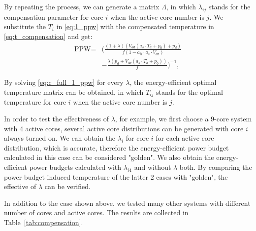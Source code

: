 
By repeating the process, we can generate a matrix $\Lambda$, in which $\lambda_{ij}$ stands for the compensation parameter for core $i$ when the active core number is $j$. We substitute the $T_{i}$ in \eqref{eq:1_ppw} with the compensated temperature in \eqref{eq:t_compensation} and get:
\begin{equation}\label{eq:1_ppw_3}
\begin{split}
\text{PPW} =& (\frac{(1+\lambda)(V_{dd}(a_{s}\cdot T_{a}+p_{0})+p_{d})}{f(1-a_{ii} \cdot a_{s} \cdot V_{dd})}\\
&-\frac{\lambda(p_{d}+V_{dd}(a_{s}\cdot T_{a}+p_{0}))}{f})^{-1},
\end{split}
\end{equation}

By solving \eqref{eq:c_full_1_ppw} for every $\lambda$, the energy-efficient optimal temperature matrix can be obtained, in which $T_{ij}$ stands for the optimal temperature for core $i$ when the active core number is $j$.

In order to test the effectiveness of $\lambda$, for example, we first choose a $9$-core system with $4$ active cores, several active core distributions can be generated with core $i$ always turned on. We can obtain the $\lambda_{i}$ for core $i$ for each active core distribution, which is accurate, therefore the energy-efficient power budget calculated in this case can be considered "golden". We also obtain the energy-efficient power budgets calculated with $\lambda_{i4}$ and without $\lambda$ both. By comparing the power budget induced temperature of the latter $2$ cases with "golden", the effective of $\lambda$ can be verified.

In addition to the case shown above, we tested many other systems with different number of cores and active cores. The results are collected in Table~\ref{tab:compensation}.

